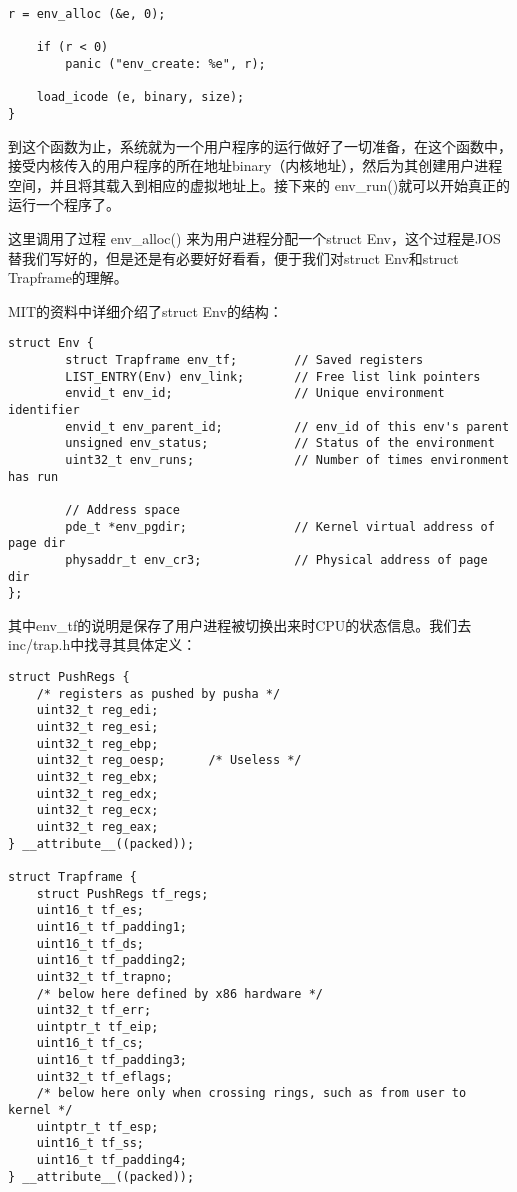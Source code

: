 \documentclass{article}
\newcommand{\funcname}[1]{{\ttfamily \small #1}}
\begin{document}
\begin{CJK*}{UTF8}{gkai}
\begin{lstlisting}[style=ccode, title={\scriptsize \ttfamily \bfseries kern/env.c: env\_create()}]
    r = env_alloc (&e, 0);

    if (r < 0)
        panic ("env_create: %e", r);

    load_icode (e, binary, size);
}
\end{lstlisting}

到这个函数为止，系统就为一个用户程序的运行做好了一切准备，在这个函数中，接受内核传入的用户程序的所在地址binary（内核地址），然后为其创建用户进程空间，并且将其载入到相应的虚拟地址上。接下来的 \funcname{env\_run()}就可以开始真正的运行一个程序了。

这里调用了过程 \funcname{env\_alloc()} 来为用户进程分配一个struct Env，这个过程是JOS替我们写好的，但是还是有必要好好看看，便于我们对struct Env和struct Trapframe的理解。

MIT的资料中详细介绍了struct Env的结构：

\begin{lstlisting}[style=ccode, title={\scriptsize \ttfamily \bfseries inc/env.h}]
struct Env {
        struct Trapframe env_tf;        // Saved registers
        LIST_ENTRY(Env) env_link;       // Free list link pointers
        envid_t env_id;                 // Unique environment identifier
        envid_t env_parent_id;          // env_id of this env's parent
        unsigned env_status;            // Status of the environment
        uint32_t env_runs;              // Number of times environment has run

        // Address space
        pde_t *env_pgdir;               // Kernel virtual address of page dir
        physaddr_t env_cr3;             // Physical address of page dir
};
\end{lstlisting}

其中env\_tf的说明是保存了用户进程被切换出来时CPU的状态信息。我们去inc/trap.h中找寻其具体定义：

\begin{lstlisting}[style=ccode, title={\scriptsize \ttfamily \bfseries inc/trap.h}]
struct PushRegs {
	/* registers as pushed by pusha */
	uint32_t reg_edi;
	uint32_t reg_esi;
	uint32_t reg_ebp;
	uint32_t reg_oesp;		/* Useless */
	uint32_t reg_ebx;
	uint32_t reg_edx;
	uint32_t reg_ecx;
	uint32_t reg_eax;
} __attribute__((packed));

struct Trapframe {
	struct PushRegs tf_regs;
	uint16_t tf_es;
	uint16_t tf_padding1;
	uint16_t tf_ds;
	uint16_t tf_padding2;
	uint32_t tf_trapno;
	/* below here defined by x86 hardware */
	uint32_t tf_err;
	uintptr_t tf_eip;
	uint16_t tf_cs;
	uint16_t tf_padding3;
	uint32_t tf_eflags;
	/* below here only when crossing rings, such as from user to kernel */
	uintptr_t tf_esp;
	uint16_t tf_ss;
	uint16_t tf_padding4;
} __attribute__((packed));
\end{lstlisting}


\end{CJK*}
\end{document}
